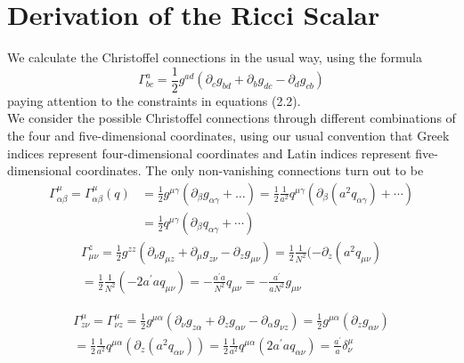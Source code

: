 \documentclass[11pt]{report}
\numberwithin{equation}{chapter}
\begin{document}
\chapter{Derivation of the Ricci Scalar}
We calculate the Christoffel connections in the usual way, using the formula
\begin{equation}
    \Gamma_{bc}^a = \frac{1}{2}g^{ad}\left(\partial_cg_{bd} + \partial_bg_{dc} - \partial_dg_{cb}\right)
\end{equation}
paying attention to the constraints in equations (2.2).\\
We consider the possible Christoffel connections through different combinations of the four and five-dimensional coordinates, using our usual convention that Greek indices represent four-dimensional coordinates and Latin indices represent five-dimensional coordinates. The only non-vanishing connections turn out to be
\begin{equation} 
    \begin{aligned}
    \Gamma_{\alpha \beta}^\mu=\Gamma_{\alpha \beta}^\mu(q) & =\frac{1}{2} g^{\mu \gamma}\left(\partial_\beta g_{\alpha \gamma}+\ldots\right)=\frac{1}{2} \frac{1}{a^2} q^{\mu \gamma}\left(\partial_\beta\left(a^2 q_{\alpha \gamma}\right)+\cdots\right) \\
    & =\frac{1}{2} q^{\mu \gamma}\left(\partial_\beta q_{\alpha \gamma}+\cdots\right)
    \end{aligned}
\end{equation}
\begin{equation}
    \begin{aligned}
    \Gamma_{\mu \nu}^z=\frac{1}{2}g^{zz}(\partial_{\nu}g_{\mu z} + \partial_{\mu}g_{z \nu} - \partial_{z}g_{\mu \nu}) = \frac{1}{2}\frac{1}{N^2}(-\partial_{z}(a^{2}q_{\mu \nu}) \\ 
    = \frac{1}{2}\frac{1}{N^2}(-2a^\prime a q_{\mu \nu}) = -\frac{a^\prime a}{N^2}q_{\mu \nu} = -\frac{a^\prime}{aN^2}g_{\mu \nu}
    \end{aligned}
\end{equation}
    
\begin{equation}
    \begin{aligned}
        \Gamma_{z \nu}^{\mu} = \Gamma_{\nu z}^{\mu} = \frac{1}{2}g^{\mu \alpha}(\partial_{\nu}g_{z \alpha} + \partial_{z}g_{\alpha \nu} - \partial_{\alpha}g_{\nu z}) = \frac{1}{2}g^{\mu \alpha}(\partial_{z}g_{\alpha \nu}) \\ = \frac{1}{2}\frac{1}{a^2}q^{\mu \alpha}(\partial_{z}(a^2q_{\alpha \nu})) = \frac{1}{2}\frac{1}{a^2}q^{\mu \alpha}(2a^\prime aq_{\alpha \nu}) = \frac{a^\prime}{a}\delta_{\nu}^{\mu}
    \end{aligned}
\end{equation}
\end{document}
